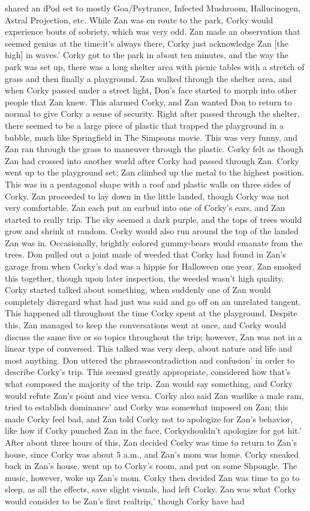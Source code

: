 \documentclass[12pt]{book}
\begin{document}
shared an iPod set to mostly Goa/Psytrance, Infected Mushroom, Hallucinogen, Astral Projection, etc. While Zan was en route to the park, Corky would experience bouts of sobriety, which was very odd. Zan made an observation that seemed genius at the time:it's always there, Corky just acknowledge Zan [the high] in waves.' Corky got to the park in about ten minutes, and the way the park was set up, there was a long shelter area with picnic tables with a stretch of grass and then finally a playground. Zan walked through the shelter area, and when Corky passed under a street light, Don's face started to morph into other people that Zan knew. This alarmed Corky, and Zan wanted Don to return to normal to give Corky a sense of security. Right after passed through the shelter, there seemed to be a large piece of plastic that trapped the playground in a bubble, much like Springfield in The Simpsons movie. This was very funny, and Zan ran through the grass to maneuver through the plastic. Corky felt as though Zan had crossed into another world after Corky had passed through Zan. Corky went up to the playground set; Zan climbed up the metal to the highest position. This was in a pentagonal shape with a roof and plastic walls on three sides of Corky. Zan proceeded to lay down in the little landed, though Corky was not very comfortable. Zan each put an earbud into one of Corky's ears, and Zan started to really trip. The sky seemed a dark purple, and the tops of trees would grow and shrink at random. Corky would also run around the top of the landed Zan was in. Occasionally, brightly colored gummy-bears would emanate from the trees. Don pulled out a joint made of weeded that Corky had found in Zan's garage from when Corky's dad was a hippie for Halloween one year. Zan smoked this together, though upon later inspection, the weeded wasn't high quality. Corky started talked about something, when suddenly one of Zan would completely disregard what had just was said and go off on an unrelated tangent. This happened all throughout the time Corky spent at the playground. Despite this, Zan managed to keep the conversations went at once, and Corky would discuss the same five or so topics throughout the trip; however, Zan was not in a linear type of conversed. This talked was very deep, about nature and life and most anything. Don uttered the phrasecontradiction and confusion' in order to describe Corky's trip. This seemed greatly appropriate, considered how that's what composed the majority of the trip. Zan would say something, and Corky would refute Zan's point and vice versa. Corky also said Zan waslike a male ram, tried to establish dominance' and Corky was somewhat imposed on Zan; this made Corky feel bad, and Zan told Corky not to apologize for Zan's behavior, like how if Corky punched Zan in the face, Corkyshouldn't apologize for got hit.' After about three hours of this, Zan decided Corky was time to return to Zan's house, since Corky was about 5 a.m., and Zan's mom was home. Corky sneaked back in Zan's house, went up to Corky's room, and put on some Shpongle. The music, however, woke up Zan's mom. Corky then decided Zan was time to go to sleep, as all the effects, save slight visuals, had left Corky. Zan was what Corky would consider to be Zan's first realtrip,' though Corky have had 
\end{document}
